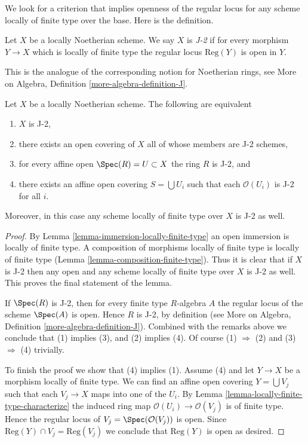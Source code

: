\noindent
We look for a criterion that implies openness of the regular locus for
any scheme locally of finite type over the base. Here is the definition.

\begin{definition}
\label{definition-J}
Let $X$ be a locally Noetherian scheme. We say $X$ is {\it J-2}
if for every morphism $Y \to X$ which is locally of finite type
the regular locus $\text{Reg}(Y)$ is open in $Y$.
\end{definition}

\noindent
This is the analogue of the corresponding notion for Noetherian
rings, see More on Algebra, Definition \ref{more-algebra-definition-J}.

\begin{lemma}
\label{lemma-J}
Let $X$ be a locally Noetherian scheme. The following are equivalent
\begin{enumerate}
\item $X$ is J-2,
\item there exists an open covering of $X$ all of whose members are
J-2 schemes,
\item for every affine open $\Spec(R) = U \subset X$ the ring
$R$ is J-2, and
\item there exists an affine open covering $S = \bigcup U_i$ such
that each $\mathcal{O}(U_i)$ is J-2 for all $i$.
\end{enumerate}
Moreover, in this case any scheme locally of finite type over $X$
is J-2 as well.
\end{lemma}

\begin{proof}
By Lemma \ref{lemma-immersion-locally-finite-type} an open immersion
is locally of finite type. A composition of morphisms locally of
finite type is locally of finite type
(Lemma \ref{lemma-composition-finite-type}). Thus it is clear that if $X$ is
J-2 then any open and any scheme locally of finite
type over $X$ is J-2 as well. This proves the final
statement of the lemma.

\medskip\noindent
If $\Spec(R)$ is J-2, then for every finite type $R$-algebra $A$
the regular locus of the scheme $\Spec(A)$ is open. Hence $R$ is
J-2, by definition (see
More on Algebra, Definition \ref{more-algebra-definition-J}).
Combined with the remarks above we conclude that (1) implies (3), and
(2) implies (4). Of course (1) $\Rightarrow$ (2) and
(3) $\Rightarrow$ (4) trivially.

\medskip\noindent
To finish the proof we show that (4) implies (1).
Assume (4) and let $Y \to X$ be a morphism locally of finite type.
We can find an affine open covering $Y = \bigcup V_j$ such that
each $V_j \to X$ maps into one of the $U_i$. By
Lemma \ref{lemma-locally-finite-type-characterize}
the induced ring map $\mathcal{O}(U_i) \to \mathcal{O}(V_j)$ is
of finite type. Hence the regular locus of
$V_j = \Spec(\mathcal{O}(V_j))$ is open. Since
$\text{Reg}(Y) \cap V_j = \text{Reg}(V_j)$ we conclude that
$\text{Reg}(Y)$ is open as desired.
\end{proof}


